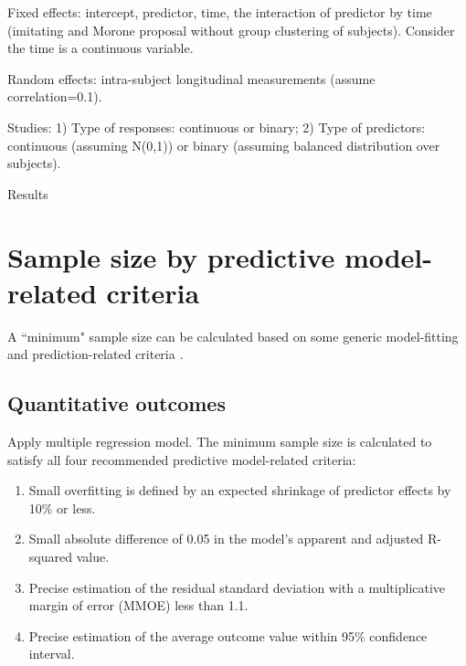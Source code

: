 \documentclass[12pt]{article}
\begin{document}
Fixed effects: intercept, predictor, time, the interaction of predictor by time (imitating \cite{morone2016mind} and Morone proposal without group clustering of subjects). Consider the time is a continuous variable. 

Random effects: intra-subject longitudinal measurements (assume correlation=0.1). 

Studies: 
1) Type of responses: continuous or binary; 
2) Type of predictors: continuous (assuming N(0,1)) or binary (assuming balanced distribution over subjects). 


Results



\section{Sample size by predictive model-related criteria}

A ``minimum" sample size can be calculated based on some generic model-fitting and prediction-related criteria  \citep{riley2019minimum,riley2019minimums}. 

\subsection{Quantitative outcomes}

Apply multiple regression model. 
The minimum sample size is calculated to satisfy all four recommended predictive model-related criteria:
\begin{enumerate}
\item Small overfitting is defined by an expected shrinkage of predictor effects by 10\% or less.
\item Small absolute difference of 0.05 in the model's apparent and adjusted R-squared value.
\item Precise estimation of the residual standard deviation with a multiplicative margin of error (MMOE) less than 1.1.
\item Precise estimation of the average outcome value within 95\% confidence interval.
\end{enumerate}
\end{document}
